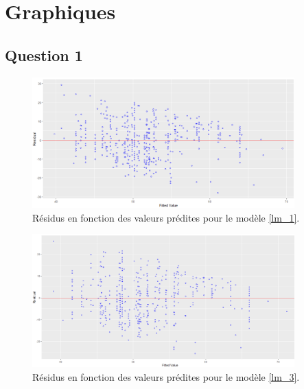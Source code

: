\documentclass{article}
\begin{document}
\newpage
\appendix
\section{Graphiques}
\renewcommand\thesubsection{\thesection.\arabic{subsection}}
\subsection{Question 1}

\begin{figure}[H]  %
	\centering
	\includegraphics[width=0.9\textwidth]{graphiques/residus_VS_predicitions_lm1}
	\caption{Résidus en fonction des valeurs prédites pour le modèle \eqref{lm_1}.}
	\label{residus_VS_predicitions_lm1}
\end{figure}

\begin{figure}[H]  %
	\centering
	\includegraphics[width=0.9\textwidth]{graphiques/residus_VS_predicitions_lm2}
	\caption{Résidus en fonction des valeurs prédites pour le modèle \eqref{lm_3}.}
	\label{residus_VS_predicitions_lm3}
\end{figure}
\end{document}
